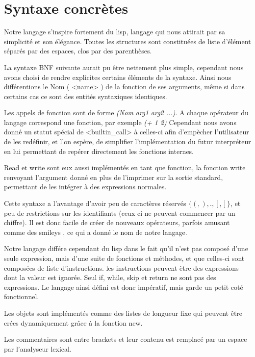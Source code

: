 \section*{Syntaxe concrètes}

Notre langage s'inspire fortement du lisp, langage qui nous attirait par sa simplicité
et son élégance. Toutes les structures sont constituées de liste d'élément séparés par
des espaces, clos par des parenthèses. 

La syntaxe BNF suivante aurait pu être nettement plus simple, cependant nous avons choisi
de rendre explicites certains éléments de la syntaxe. Ainsi nous différentions le Nom ( <name> )
de la fonction de ses arguments, même si dans certains cas ce sont des entités syntaxiques identiques. 

Les appels de fonction sont de forme \emph{(Nom arg1 arg2 ...)}. A chaque opérateur du langage 
correspond une fonction, par exemple \emph{(+ 1 2)} Cependant nous avons donné un statut spécial
de <builtin\_call> à celles-ci afin d'empècher l'utilisateur de les redéfinir, et l'on espère,
de simplifier l'implémentation du futur interpréteur en lui permettant de repérer directement
les fonctions internes. 

Read et write sont eux aussi implémentés en tant que fonction, la fonction write renvoyant
l'argument donné en plus de l'imprimer sur la sortie standard, permettant de les intégrer
à des expressions normales. 

Cette syntaxe a l'avantage d'avoir peu de caractères réservés $\{ (,),.,[,]\}$, et peu
de restrictions sur les identifiants (ceux ci ne peuvent commencer par un chiffre). Il
est donc facile de créer de nouveaux opérateurs, parfois amusant comme des smileys , ce
qui a donné le nom de notre langage.  

Notre langage différe cependant du lisp dans le fait qu'il n'est pas composé d'une seule
expression, mais d'une suite de fonctions et méthodes, et que celles-ci sont composées de
liste d'instructions. les instructions peuvent ètre des expressions dont la valeur est 
ignorée. Seul if, while, skip et return ne sont pas des expressions.
Le langage ainsi défini est donc impératif, mais garde un petit coté fonctionnel. 

Les objets sont implémentés comme des listes de longueur fixe qui peuvent être crées dynamiquement
grâce à la fonction new.

Les commentaires sont entre brackets et leur contenu est remplacé par un espace par l'analyseur lexical. 

